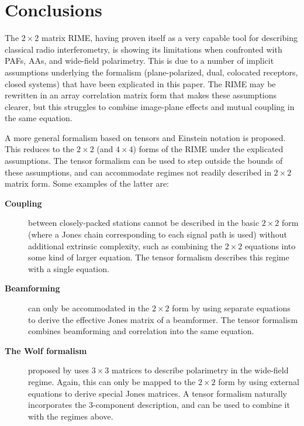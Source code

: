 \documentclass[]{aa}
\begin{document}
\section{Conclusions}

The $2\times2$ matrix RIME, having proven itself as a very capable tool for describing classical radio interferometry, is showing its limitations when confronted with PAFs, AAs, and wide-field polarimetry. This is due to a number of implicit assumptions underlying the formalism (plane-polarized, dual, colocated receptors, closed systems) that have been explicated in this paper. The RIME may be rewritten in an array correlation matrix form that makes these assumptions clearer, but this struggles to combine image-plane effects and mutual coupling in the same equation.

A more general formalism based on tensors and Einstein notation is proposed. This reduces to the $2\times2$ (and $4\times4$) forms of the RIME under the explicated assumptions. The tensor formalism can be used to step outside the bounds of these assumptions, and can accommodate regimes not readily described in $2\times2$ matrix form. Some examples of the latter are:

\begin{description}

\item[{\bf Coupling}] between closely-packed stations cannot be described in the basic $2\times2$ form (where a Jones chain corresponding to each signal path is used) without additional extrinsic complexity, such as combining the $2\times2$ equations into some kind of larger equation. The tensor formalism describes this regime with a single equation.

\item[{\bf Beamforming}] can only be accommodated in the $2\times2$ form by using separate equations to derive the effective Jones matrix of a beamformer. The tensor formalism combines beamforming and correlation into the same equation.

\item[{\bf The Wolf formalism}] proposed by \citet{Carozzi:ME3D} uses $3\times3$ matrices to describe polarimetry in the wide-field regime. Again, this can only be mapped to the $2\times2$ form by using external equations to derive special Jones matrices. A tensor formalism naturally incorporates the 3-component description, and can be used to combine it with the regimes above.

\end{description}
\end{document}
